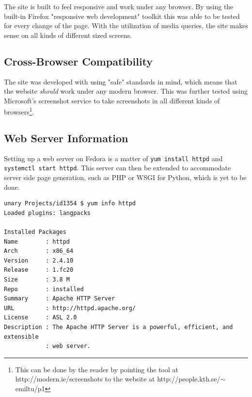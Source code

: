 \documentclass[a4paper]{scrartcl}
\begin{document}
The site is built to feel responsive and work under any browser. By using the built-in Firefox "responsive web development" toolkit this was able to be tested for every change of the page. With the utilization of media queries, the site makes sense on all kinds of different sized screens.

\subsection{Cross-Browser Compatibility}

The site was developed with using "safe" standards in mind, which means that the website \textit{should} work under any modern browser. This was further tested using Microsoft's screenshot service to take screenshots in all different kinds of browsers\footnote{This can be done by the reader by pointing the tool at http://modern.ie/screenshots to the website at http://people.kth.se/$\sim$emiltu/p1}.

\subsection{Web Server Information}
\label{subsec:httpd}

Setting up a web server on Fedora is a matter of \texttt{yum install httpd} and \texttt{systemctl start httpd}. This server can then be extended to accommodate server side page generation, such as PHP or WSGI for Python, which is yet to be done.

\begin{lstlisting}
unary Projects/id1354 $ yum info httpd                                                                                                       
Loaded plugins: langpacks

Installed Packages
Name        : httpd
Arch        : x86_64
Version     : 2.4.10
Release     : 1.fc20
Size        : 3.8 M
Repo        : installed
Summary     : Apache HTTP Server
URL         : http://httpd.apache.org/
License     : ASL 2.0
Description : The Apache HTTP Server is a powerful, efficient, and extensible
            : web server.
\end{lstlisting}
\end{document}
